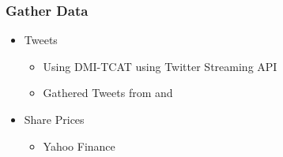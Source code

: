 \begin{frame}
  \frametitle{Gather Data}

  \begin{itemize}
    \item Tweets
      \begin{itemize}
        \item Using DMI-TCAT using Twitter Streaming API
        \item Gathered Tweets from  and 
      \end{itemize}
    
    \item Share Prices
      \begin{itemize}
        \item Yahoo Finance
      \end{itemize}
    
  \end{itemize}

\end{frame}

